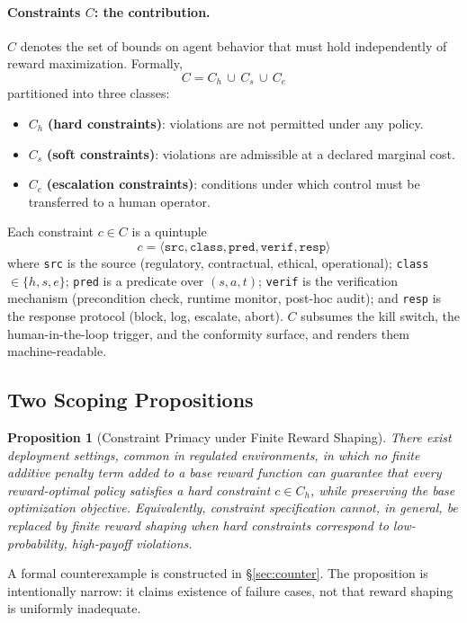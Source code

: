 \documentclass[11pt,a4paper]{article}
\newtheorem{proposition}{Proposition}
\theoremstyle{remark}
\begin{document}
\paragraph{Constraints $C$: the contribution.} $C$ denotes the set of bounds on agent behavior that must hold independently of reward maximization. Formally,
\[
    C = C_h \,\cup\, C_s \,\cup\, C_e
\]
partitioned into three classes:
\begin{itemize}[leftmargin=2em,topsep=0.3em,itemsep=0.2em]
\item $C_h$ \textbf{(hard constraints)}: violations are not permitted under any policy.
\item $C_s$ \textbf{(soft constraints)}: violations are admissible at a declared marginal cost.
\item $C_e$ \textbf{(escalation constraints)}: conditions under which control must be transferred to a human operator.
\end{itemize}
Each constraint $c \in C$ is a quintuple
\[
    c = \langle \texttt{src}, \texttt{class}, \texttt{pred}, \texttt{verif}, \texttt{resp} \rangle
\]
where \texttt{src} is the source (regulatory, contractual, ethical, operational); \texttt{class} $\in \{h, s, e\}$; \texttt{pred} is a predicate over $(s, a, t)$; \texttt{verif} is the verification mechanism (precondition check, runtime monitor, post-hoc audit); and \texttt{resp} is the response protocol (block, log, escalate, abort). $C$ subsumes the kill switch, the human-in-the-loop trigger, and the conformity surface, and renders them machine-readable.

\subsection{Two Scoping Propositions}

\begin{proposition}[Constraint Primacy under Finite Reward Shaping]\label{prop:primacy}
There exist deployment settings, common in regulated environments, in which no finite additive penalty term added to a base reward function can guarantee that every reward-optimal policy satisfies a hard constraint $c \in C_h$, while preserving the base optimization objective. Equivalently, constraint specification cannot, in general, be replaced by finite reward shaping when hard constraints correspond to low-probability, high-payoff violations.
\end{proposition}

A formal counterexample is constructed in \S\ref{sec:counter}. The proposition is intentionally narrow: it claims existence of failure cases, not that reward shaping is uniformly inadequate.
\end{document}
